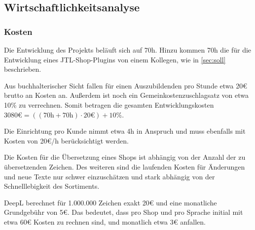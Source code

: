 \subsection{Wirtschaftlichkeitsanalyse}
\subsubsection{Kosten}
Die Entwicklung des Projekts beläuft sich auf 70h. 
Hinzu kommen 70h die für die Entwicklung eines JTL-Shop-Plugins von einem Kollegen, wie in \ref{sec:soll} beschrieben.

Aus buchhalterischer Sicht fallen für einen Auszubildenden pro Stunde etwa 20€ brutto an Kosten an. Außerdem ist noch ein Gemeinkostenzuschlagsatz von etwa 10\% zu verrechnen. 
Somit betragen die gesamten Entwicklungskosten \( 3080\text{€} = ((70\text{h} + 70\text{h}) \cdot 20\text{€} ) + 10\%   \).

Die Einrichtung pro Kunde nimmt etwa 4h in Anspruch und muss ebenfalls mit Kosten von 20€/h berücksichtigt werden.

Die Kosten für die Übersetzung eines Shops ist abhängig von der Anzahl der zu übersetzenden Zeichen. 
Des weiteren sind die laufenden Kosten für Änderungen und neue Texte nur schwer einzuschätzen und stark abhängig von der Schnelllebigkeit des Sortiments. 

DeepL berechnet für 1.000.000 Zeichen exakt 20€ und eine monatliche Grundgebühr von 5€. 
Das bedeutet, dass pro Shop und pro Sprache initial mit etwa 60€ Kosten zu rechnen sind, und monatlich etwa 3€ anfallen.


